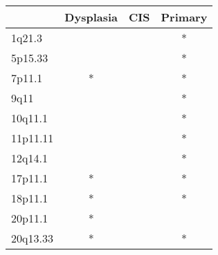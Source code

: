 \begin{tabular}{lccc}
\toprule
{} & Dysplasia & CIS & Primary \\
\midrule
1q21.3   &           &     &       * \\
5p15.33  &           &     &       * \\
7p11.1   &         * &     &       * \\
9q11     &           &     &       * \\
10q11.1  &           &     &       * \\
11p11.11 &           &     &       * \\
12q14.1  &           &     &       * \\
17p11.1  &         * &     &       * \\
18p11.1  &         * &     &       * \\
20p11.1  &         * &     &         \\
20q13.33 &         * &     &       * \\
\bottomrule
\end{tabular}
